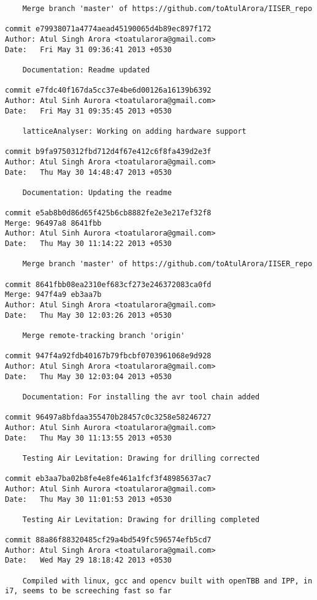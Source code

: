 \begin{lstlisting}
    Merge branch 'master' of https://github.com/toAtulArora/IISER_repo

commit e79938071a4774aead45190065d4b89ec897f172
Author: Atul Singh Arora <toatularora@gmail.com>
Date:   Fri May 31 09:36:41 2013 +0530

    Documentation: Readme updated

commit e7fdc40f167da5cc37e4be6d00126a16139b6392
Author: Atul Sinh Aurora <toatularora@gmail.com>
Date:   Fri May 31 09:35:45 2013 +0530

    latticeAnalyser: Working on adding hardware support

commit b9fa9750312fbd712d4f67e412c6f8fa439d2e3f
Author: Atul Singh Arora <toatularora@gmail.com>
Date:   Thu May 30 14:48:47 2013 +0530

    Documentation: Updating the readme

commit e5ab8b0d86d65f425b6cb8882fe2e3e217ef32f8
Merge: 96497a8 8641fbb
Author: Atul Sinh Aurora <toatularora@gmail.com>
Date:   Thu May 30 11:14:22 2013 +0530

    Merge branch 'master' of https://github.com/toAtulArora/IISER_repo

commit 8641fbb08ea2310ef683cf273e246372083ca0fd
Merge: 947f4a9 eb3aa7b
Author: Atul Singh Arora <toatularora@gmail.com>
Date:   Thu May 30 12:03:26 2013 +0530

    Merge remote-tracking branch 'origin'

commit 947f4a92fdb40167b79fbcbf0703961068e9d928
Author: Atul Singh Arora <toatularora@gmail.com>
Date:   Thu May 30 12:03:04 2013 +0530

    Documentation: For installing the avr tool chain added

commit 96497a8bfdaa355470b28457c0c3258e58246727
Author: Atul Sinh Aurora <toatularora@gmail.com>
Date:   Thu May 30 11:13:55 2013 +0530

    Testing Air Levitation: Drawing for drilling corrected

commit eb3aa7ba02b8fe4e8fe461a1fcf3f48985637ac7
Author: Atul Sinh Aurora <toatularora@gmail.com>
Date:   Thu May 30 11:01:53 2013 +0530

    Testing Air Levitation: Drawing for drilling completed

commit 88a86f88320485cf29a4bd549fc596574efb5cd7
Author: Atul Singh Arora <toatularora@gmail.com>
Date:   Wed May 29 18:18:42 2013 +0530

    Compiled with linux, gcc and opencv built with openTBB and IPP, in i7, seems to be screeching fast so far


\end{lstlisting}
